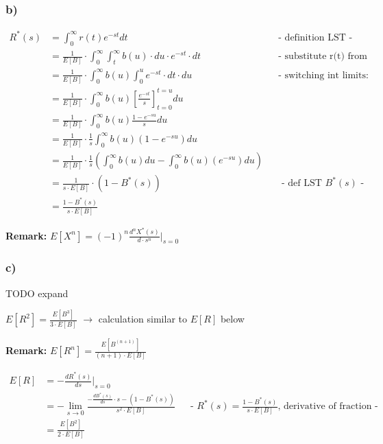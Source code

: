 \subsubsection*{ b) }

\begin{align*}
R^{\ast} \left(s\right)&=\int _{0}^{\infty }r\left(t\right)e^{{-st}}dt&& \text{-  definition LST -}\\
&=\frac{1}{E\left[B\right]}\cdot \int _{0}^{\infty }\int _{t}^{\infty }b\left(u\right) \cdot du \cdot e^{{-st}} \cdot dt&& \text{-  substitute r(t) from a) -}\\
&=\frac{1}{E\left[B\right]}\cdot \int _{0}^{\infty }b\left(u\right)\int _{0}^{u}e^{{-st}} \cdot dt \cdot du && \text{- switching int limits: youtu.be/j6A44yQrGfU -}\\
&=\frac{1}{E\left[B\right]}\cdot \int _{0}^{\infty }b\left(u\right)\left[\frac{e^{{-st}}}{s}\right]_{{t=0}}^{{t=u}}du\\
&=\frac{1}{E\left[B\right]}\cdot \int _{0}^{\infty }b\left(u\right)\frac{1-e^{{-su}}}{s}du\\
&=\frac{1}{E\left[B\right]}\cdot \frac{1}{s}\int _{0}^{\infty }b\left(u\right)\left(1-e^{{-su}}\right)du\\
&=\frac{1}{E\left[B\right]}\cdot \frac{1}{s}\left(\int _{0}^{\infty }b\left(u\right)du-\int _{0}^{\infty }b\left(u\right)\left(e^{{-su}}\right)du\right)\\
&=\frac{1}{s\cdot E\left[B\right]} \cdot \left(1-B^{{*}}\left(s\right)\right) && \text{ - def LST $B^{{*}}\left(s\right)$ - }\\
&=\frac{1-B^{{*}}\left(s\right)}{s\cdot E\left[B\right]}
\end{align*}

\textbf{Remark:} $E\left[X^{n}\right]=\left(-1\right)^{n}\frac{d^{n}X^{{*}}\left(s\right)}{d\cdot s^{n}}\bigg\rvert_{{s=0}}$

\subsubsection*{ c) }

TODO expand

$E\left[R^{2}\right]=\frac{E\left[B^{3}\right]}{3\cdot E\left[B\right]}$ $\rightarrow$ calculation similar to $E\left[R\right]$ below

\textbf{Remark:} $E\left[R^{n}\right]=\frac{E\left[B^{\left(n+1\right)}\right]}{\left(n+1\right)\cdot E\left[B\right]}$

\begin{align*}
E\left[R\right]&=-\frac{dR^{{*}}\left(s\right)}{ds}\bigg\rvert_{{s=0}}\\
&=-\lim _{{s\rightarrow 0}}\frac{-\frac{dB^{{*}}\left(s\right)}{ds}\cdot s-\left(1-B^{{*}}\left(s\right)\right)}{s^{2}\cdot E\left[B\right]} && \text{- $R^{\ast}(s)=\frac{1-B^{{*}}\left(s\right)}{s\cdot E\left[B\right]}$, derivative of fraction -}\\
&=\frac{E\left[B^{2}\right]}{2\cdot E\left[B\right]}
\end{align*}

